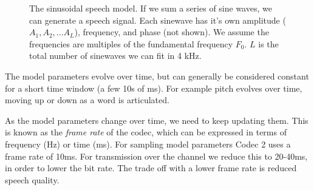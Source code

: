 \documentclass{article}
\begin{document}
\begin{figure}[h]
\caption{The sinusoidal speech model.  If we sum a series of sine waves, we can generate a speech signal.  Each sinewave has it's own amplitude ($A_1,A_2,... A_L$), frequency, and phase (not shown).  We assume the frequencies are multiples of the fundamental frequency $F_0$. $L$ is the total number of sinewaves we can fit in 4 kHz.}
\label{fig:sinusoidal_model}
\begin{center}
\end{center}
\end{figure}

The model parameters evolve over time, but can generally be considered constant for a short time window (a few 10s of ms).  For example pitch evolves over time, moving up or down as a word is articulated.

As the model parameters change over time, we need to keep updating them.  This is known as the \emph{frame rate} of the codec, which can be expressed in terms of frequency (Hz) or time (ms).  For sampling model parameters Codec 2 uses a frame rate of 10ms.  For transmission over the channel we reduce this to 20-40ms, in order to lower the bit rate.  The trade off with a lower frame rate is reduced speech quality.
\end{document}
